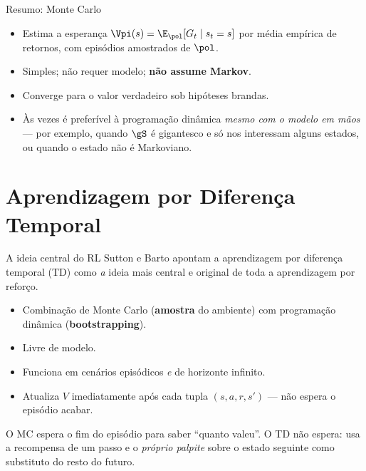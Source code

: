 \documentclass[aspectratio=169, 11pt]{beamer}
\begin{document}
\begin{frame}{Resumo: Monte Carlo}
  \begin{itemize}
    \item Estima a esperança $\Vpi(s) = \E_{\pol}[G_t \mid s_t = s]$
      por média empírica de retornos, com episódios amostrados de $\pol$.
    \item Simples; não requer modelo; \textbf{não assume Markov}.
    \item Converge para o valor verdadeiro sob hipóteses brandas.
    \item Às vezes é preferível à programação dinâmica \emph{mesmo com o
      modelo em mãos} — por exemplo, quando $\gS$ é gigantesco e só nos
      interessam alguns estados, ou quando o estado não é Markoviano.
  \end{itemize}
\end{frame}

\section{Aprendizagem por Diferença Temporal}

\begin{frame}{A ideia central do RL}
  Sutton e Barto apontam a aprendizagem por diferença temporal (TD) como
  \emph{a} ideia mais central e original de toda a aprendizagem por reforço.

  \medskip
  \begin{itemize}
    \item Combinação de Monte Carlo (\textbf{amostra} do ambiente) com
      programação dinâmica (\textbf{bootstrapping}).
    \item Livre de modelo.
    \item Funciona em cenários episódicos \emph{e} de horizonte infinito.
    \item Atualiza $V$ \alert{imediatamente} após cada tupla $(s, a, r, s')$
      — não espera o episódio acabar.
  \end{itemize}

  \begin{ideiabox}
    O MC espera o fim do episódio para saber ``quanto valeu''.
    O TD não espera: usa a recompensa de um passo e o \emph{próprio
    palpite} sobre o estado seguinte como substituto do resto do futuro.
  \end{ideiabox}
\end{frame}
\end{document}
